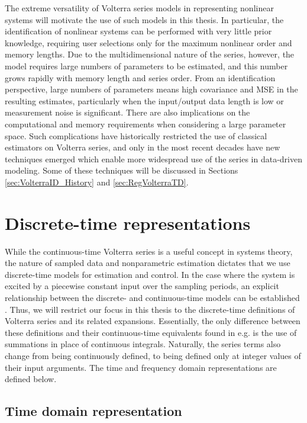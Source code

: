 The extreme versatility of Volterra series models in representing nonlinear systems will motivate the use of such models in this thesis. In particular, the identification of nonlinear systems can be performed with very little prior knowledge, requiring user selections only for the maximum nonlinear order and memory lengths. Due to the multidimensional nature of the series, however, the model requires large numbers of parameters to be estimated, and this number grows rapidly with memory length and series order. From an identification perspective, large numbers of parameters means high covariance and MSE in the resulting estimates, particularly when the input/output data length is low or measurement noise is significant. There are also implications on the computational and memory requirements when considering a large parameter space. Such complications have historically restricted the use of classical estimators on Volterra series, and only in the most recent decades have new techniques emerged which enable more widespread use of the series in data-driven modeling. Some of these techniques will be discussed in Sections \ref{sec:VolterraID_History} and \ref{sec:RegVolterraTD}. 

\section{Discrete-time representations}
\label{sec:DTrepresentations_Volterra}

While the continuous-time Volterra series is a useful concept in systems theory, the nature of sampled data and nonparametric estimation dictates that we use discrete-time models for estimation and control. In the case where the system is excited by a piecewise constant input over the sampling periods, an explicit relationship between the discrete- and continuous-time models can be established \cite{Middleton1990}. Thus, we will restrict our focus in this thesis to the discrete-time definitions of Volterra series and its related expansions. Essentially, the only difference between these definitions and their continuous-time equivalents found in e.g. \cite{Schetzen1980} is the use of summations in place of continuous integrals. Naturally, the series terms also change from being continuously defined, to being defined only at integer values of their input arguments. The time and frequency domain representations are defined below.

\subsection{Time domain representation}

